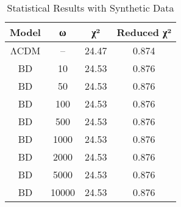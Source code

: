 \begin{table}[ht]
\centering
\caption{Statistical Results with Synthetic Data}
\label{tab:stats_synthetic}
\begin{tabular}{cccc}
\toprule
Model & ω & χ² & Reduced χ² \\
\midrule
ΛCDM & -- & 24.47 & 0.874 \\
BD & 10 & 24.53 & 0.876 \\
BD & 50 & 24.53 & 0.876 \\
BD & 100 & 24.53 & 0.876 \\
BD & 500 & 24.53 & 0.876 \\
BD & 1000 & 24.53 & 0.876 \\
BD & 2000 & 24.53 & 0.876 \\
BD & 5000 & 24.53 & 0.876 \\
BD & 10000 & 24.53 & 0.876 \\
\bottomrule
\end{tabular}
\end{table}
